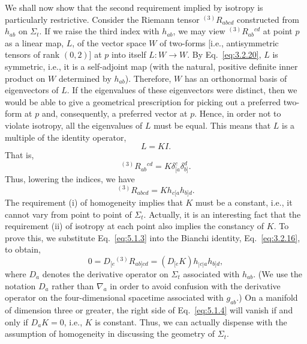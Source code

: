 We shall now show that the second requirement implied by isotropy is particularly
restrictive. Consider the Riemann tensor \({}^{(3)}R_{abcd}\) constructed from
\(h_{ab}\) on \(\Sigma_t\). If we raise the third index with \(h_{ab}\), we may view
\({}^{(3)}R_{ab}{}^{cd}\) at point \(p\) as a linear map, \(L\), of the vector space
\(W\) of two-forms [i.e., antisymmetric tensors of rank \((0,2)\)] at \(p\) into
itself \(L:W\to W\). By Eq.~\eqref{eq:3.2.20}, \(L\) is symmetric, i.e., it is a
self-adjoint map (with the natural, positive definite inner product on \(W\)
determined by \(h_{ab}\)). Therefore, \(W\) has an orthonormal basis of eigenvectors
of \(L\). If the eigenvalues of these eigenvectors were distinct, then we would be
able to give a geometrical prescription for picking out a preferred two-form at \(p\)
and, consequently, a preferred vector at \(p\). Hence, in order not to violate
isotropy, all the eigenvalues of \(L\) must be equal. This means that \(L\) is a
multiple of the identity operator,
\begin{equation}
  L=KI.
  \tag{5.1.1}\label{eq:5.1.1}
\end{equation}
That is,
\begin{equation}
  {}^{(3)}R_{ab}{}^{cd}=K\delta^c_{[a}\delta^d_{b]}.
  \tag{5.1.2}\label{eq:5.1.2}
\end{equation}
Thus, lowering the indices, we have
\begin{equation}
  {}^{(3)}R_{abcd}=K h_{c[a}h_{b]d}.
  \tag{5.1.3}\label{eq:5.1.3}
\end{equation}
The requirement (i) of homogeneity implies that \(K\) must be a constant, i.e., it
cannot vary from point to point of \(\Sigma_t\). Actually, it is an interesting fact
that the requirement (ii) of isotropy at each point also implies the constancy of
\(K\). To prove this, we substitute Eq.~\eqref{eq:5.1.3} into the Bianchi identity,
Eq.~\eqref{eq:3.2.16}, to obtain,
\begin{equation}
  0=D_{[e}{}^{(3)}R_{ab]cd}=(D_{[e}K)h_{|c|a}h_{b]d},
  \tag{5.1.4}\label{eq:5.1.4}
\end{equation}
where \(D_a\) denotes the derivative operator on \(\Sigma_t\) associated with
\(h_{ab}\). (We use the notation \(D_a\) rather than \(\nabla_a\) in order to avoid
confusion with the derivative operator on the four-dimensional spacetime associated
with \(g_{ab}\).) On a manifold of dimension three or greater, the right side of
Eq.~\eqref{eq:5.1.4} will vanish if and only if \(D_aK=0\), i.e., \(K\) is constant.
Thus, we can actually dispense with the assumption of homogeneity in discussing the
geometry of \(\Sigma_t\).

